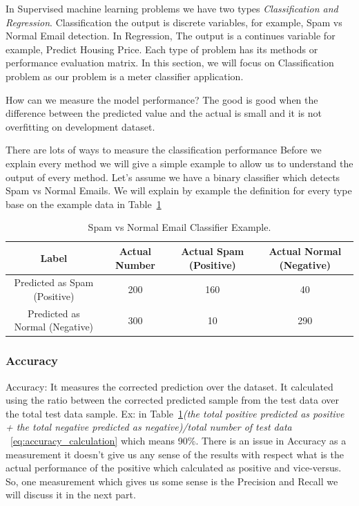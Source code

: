 In Supervised machine learning problems we have two types \textit{Classification and Regression}. Classification the output is discrete variables, for example, Spam vs Normal Email detection. In Regression, The output is a continues variable for example, Predict Housing Price. Each type of problem has its methods or performance evaluation matrix. In this section, we will focus on Classification problem as our problem is a meter classifier application.

How can we measure the model performance? The good is good when the difference between the predicted value and the actual is small and it is not overfitting on development dataset.

There are lots of ways to measure the classification performance Before we explain every method we will give a simple example to allow us to understand the output of every method. Let’s assume we have a binary classifier which detects Spam vs Normal Emails. We will explain by example the definition for every type base on the example data in Table~\ref{Tab:EmailClassifier}

\begin{table}[t]
  \centering
  \begin{tabular}{c c c c}
    \toprule
    \textbf{Label}& \textbf{Actual Number}& \textbf{Actual Spam (Positive)} &  \textbf{Actual Normal (Negative)}\\
    \midrule
    Predicted as Spam (Positive)   & 200 & \cellcolor{green!25}160 & \cellcolor{red!25}40 \\
    Predicted as Normal (Negative)      & 300   & \cellcolor{red!25}10   & \cellcolor{green!25}290\\
    \bottomrule
  \end{tabular}
  \caption{Spam vs Normal Email Classifier Example.}\label{Tab:EmailClassifier}
\end{table}


\subsubsection{Accuracy}

Accuracy: It measures the corrected prediction over the dataset. It calculated using the ratio between the corrected predicted sample from the test data over the total test data sample. Ex: in Table~\ref{Tab:EmailClassifier}\textit{(the total positive predicted as positive + the total negative predicted as negative)/total number of test data }~\eqref{eq:accuracy_calculation} which means 90\%. There is an issue in Accuracy as a measurement it doesn’t give us any sense of the results with respect what is the actual performance of the positive which calculated as positive and vice-versus. So, one measurement which gives us some sense is the Precision and Recall we will discuss it in the next part.

